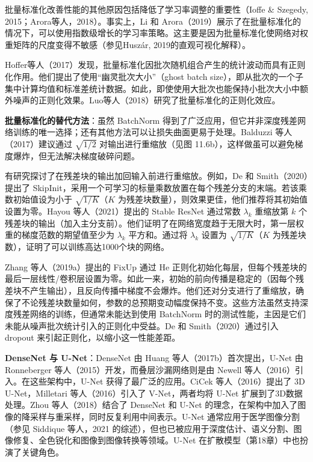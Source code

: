 \documentclass[lang=cn,newtx,10pt,scheme=chinese]{elegantbook}
\begin{document}
批量标准化改善性能的其他原因包括降低了学习率调整的重要性（Ioffe \& Szegedy, 2015；Arora等人，2018）。事实上，Li 和 Arora（2019）展示了在批量标准化的情况下，可以使用指数级增长的学习率策略。这主要是因为批量标准化使网络对权重矩阵的尺度变得不敏感（参见Huszár, 2019的直观可视化解释）。

Hoffer等人（2017）发现，批量标准化因批次随机组合产生的统计波动而具有正则化作用。他们提出了使用“幽灵批次大小”（ghost batch size），即从批次的一个子集中计算均值和标准差统计数据。如此，即使使用大批次也能保持小批次大小中额外噪声的正则化效果。Luo等人（2018）研究了批量标准化的正则化效应。

\textbf{批量标准化的替代方法}：虽然 BatchNorm 得到了广泛应用，但它并非深度残差网络训练的唯一选择；还有其他方法可以让损失曲面更易于处理。Balduzzi 等人（2017）建议通过 \(\sqrt{1/2}\) 对输出进行重缩放（见图 11.6b），这样做虽可以避免梯度爆炸，但无法解决梯度破碎问题。

有研究探讨了在残差块的输出加回输入前进行重缩放。例如，De 和 Smith（2020）提出了 SkipInit，采用一个可学习的标量乘数放置在每个残差分支的末端。若该乘数初始值设为小于 \(\sqrt{1/K}\)（\(K\) 为残差块数量），则效果更佳，他们推荐将其初始值设置为零。Hayou 等人（2021）提出的 Stable ResNet 通过常数 \(\lambda_k\) 重缩放第 \(k\) 个残差块的输出（加入主分支前）。他们证明了在网络宽度趋于无限大时，第一层权重的梯度范数的期望值至少为 \(\lambda_k\) 平方和。通过将 \(\lambda_k\) 设置为 \(\sqrt{1/K}\)（\(K\) 为残差块数），证明了可以训练高达1000个块的网络。

Zhang 等人（2019a）提出的 FixUp 通过 He 正则化初始化每层，但每个残差块的最后一层线性/卷积层设置为零。如此一来，初始的前向传播是稳定的（因每个残差块不产生输出），且反向传播中梯度不会爆炸。他们还对分支进行了重缩放，确保了不论残差块数量如何，参数的总预期变动幅度保持不变。这些方法虽然支持深度残差网络的训练，但通常未能达到使用 BatchNorm 时的测试性能，主因是它们未能从噪声批次统计引入的正则化中受益。De 和 Smith（2020）通过引入 dropout 来引起正则化，以缩小这一性能差距。

\textbf{DenseNet 与 U-Net}：DenseNet 由 Huang 等人（2017b）首次提出，U-Net 由 Ronneberger 等人（2015）开发，而叠层沙漏网络则是由 Newell 等人（2016）引入。在这些架构中，U-Net 获得了最广泛的应用。CiCek 等人（2016）提出了 3D U-Net，Milletari 等人（2016）引入了 V-Net，两者均将 U-Net 扩展到了3D数据处理。Zhou 等人（2018）结合了 DenseNet 和 U-Net 的理念，在架构中加入了图像的降采样与重采样，同时反复利用中间表示。U-Net 通常应用于医学图像分割（参见 Siddique 等人，2021 的综述），但也已被应用于深度估计、语义分割、图像修复、全色锐化和图像到图像转换等领域。U-Net 在扩散模型（第18章）中也扮演了关键角色。
\end{document}
